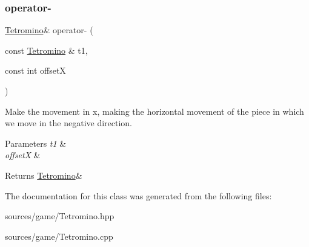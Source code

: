 \subsubsection{\texorpdfstring{operator-\/}{operator-}}
{\footnotesize\ttfamily \hyperlink{classTetromino}{Tetromino}\& operator-\/ (\begin{DoxyParamCaption}\item[{const \hyperlink{classTetromino}{Tetromino} \&}]{t1,  }\item[{const int}]{offsetX }\end{DoxyParamCaption})\hspace{0.3cm}{\ttfamily [friend]}}



Make the movement in x, making the horizontal movement of the piece in which we move in the negative direction. 


\begin{DoxyParams}{Parameters}
{\em t1} & \\
\hline
{\em offsetX} & \\
\hline
\end{DoxyParams}
\begin{DoxyReturn}{Returns}
\hyperlink{classTetromino}{Tetromino}\& 
\end{DoxyReturn}


The documentation for this class was generated from the following files\+:\begin{DoxyCompactItemize}
\item 
sources/game/Tetromino.\+hpp\item 
sources/game/Tetromino.\+cpp\end{DoxyCompactItemize}
